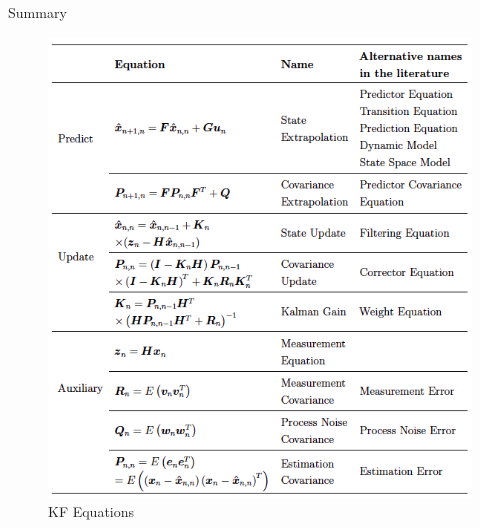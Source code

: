 \begin{frame}{Summary}
\vspace{-7pt}
\begin{figure}
    \centering
    \includegraphics[width=0.55\linewidth]{Figures//Chapter2/KF Equations.png}
    \caption{KF Equations}
    \vspace{-15pt}
    \label{fig:KF_Equations}
\end{figure}
\end{frame}